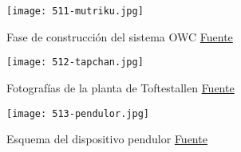 \begin{figure}
\centering
\texttt{[image: 511-mutriku.jpg]}
\caption[Fase de construcción del sistema OWC]{Fase de construcción del sistema OWC \href{http://www.interempresas.net/Energia/Articulos/101717-Energia-undimotriz-un-inmenso-potencial-aun-por-desarrollar.html}{Fuente}}
\label{fig:mutriku}
\end{figure}

\begin{figure}
\centering
\texttt{[image: 512-tapchan.jpg]}
\caption[Fotografías de la planta de Toftestallen]{Fotografías de la planta de Toftestallen \href{https://coastlight.net/detaljer/4283/Toftestallen/}{Fuente}}
\label{fig:tapchan}
\end{figure}

\begin{figure}
\centering
\texttt{[image: 513-pendulor.jpg]}
\caption[Esquema del dispositivo pendulor]{Esquema del dispositivo pendulor \href{http://energyprofessionalsymposium.com/?p=36743}{Fuente}}
\label{fig:pendulor}
\end{figure}

